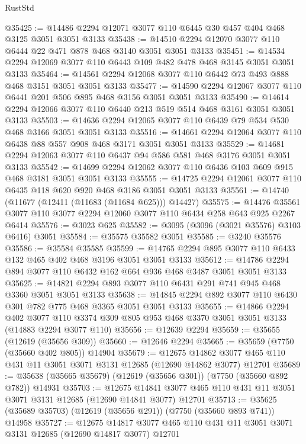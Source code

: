 \begin{lexlean}{RustStd}
\begin{coremodule}
@35425 := @14486 @2294 @12071 @3077 @110 @6445 @30 @457 @404 @468 @3125 @3051 @3051 @3133
@35438 := @14510 @2294 @12070 @3077 @110 @6444 @22 @471 @878 @468 @3140 @3051 @3051 @3133
@35451 := @14534 @2294 @12069 @3077 @110 @6443 @109 @482 @478 @468 @3145 @3051 @3051 @3133
@35464 := @14561 @2294 @12068 @3077 @110 @6442 @73 @493 @888 @468 @3151 @3051 @3051 @3133
@35477 := @14590 @2294 @12067 @3077 @110 @6441 @201 @506 @895 @468 @3156 @3051 @3051 @3133
@35490 := @14614 @2294 @12066 @3077 @110 @6440 @213 @519 @514 @468 @3161 @3051 @3051 @3133
@35503 := @14636 @2294 @12065 @3077 @110 @6439 @79 @534 @530 @468 @3166 @3051 @3051 @3133
@35516 := @14661 @2294 @12064 @3077 @110 @6438 @88 @557 @908 @468 @3171 @3051 @3051 @3133
@35529 := @14681 @2294 @12063 @3077 @110 @6437 @94 @586 @581 @468 @3176 @3051 @3051 @3133
@35542 := @14699 @2294 @12062 @3077 @110 @6436 @103 @609 @915 @468 @3181 @3051 @3051 @3133
@35555 := @14725 @2294 @12061 @3077 @110 @6435 @118 @620 @920 @468 @3186 @3051 @3051 @3133
@35561 := @14740 (@11677 (@12411 (@11683 (@11684 @625))) @14427)
@35575 := @14476 @35561 @3077 @110 @3077 @2294 @12060 @3077 @110 @6434 @258 @643 @925 @2267 @6414
@35576 := @3023 @625
@35582 := @3095 (@3096 (@3021 @35576) @3103 @6416) @3051
@35584 := @35575 @35582 @3051
@35585 := @3240 @35576
@35586 := @35584 @35585
@35599 := @14765 @2294 @895 @3077 @110 @6433 @132 @465 @402 @468 @3196 @3051 @3051 @3133
@35612 := @14786 @2294 @894 @3077 @110 @6432 @162 @664 @936 @468 @3487 @3051 @3051 @3133
@35625 := @14821 @2294 @893 @3077 @110 @6431 @291 @741 @945 @468 @3360 @3051 @3051 @3133
@35638 := @14845 @2294 @892 @3077 @110 @6430 @301 @782 @775 @468 @3365 @3051 @3051 @3133
@35655 := @14866
    @2294
    @402
    @3077
    @110
    @3374
    @309
    @805
    @953
    @468
    @3370
    @3051
    @3051
    @3133
    (@14883 @2294 @3077 @110)
@35656 := @12639 @2294
@35659 := @35655 (@12619 (@35656 @309))
@35660 := @12646 @2294
@35665 := @35659 (@7750 (@35660 @402 @805)) @14904
@35679 := @12675
    @14862
    @3077
    @465
    @110
    @431
    @11
    @3051
    @3071
    @3131
    @12685
    (@12690 @14862 @3077)
    @12701
@35689 := @35638 (@35665 @35679) (@12619 (@35656 @301)) (@7750 (@35660 @892 @782)) @14931
@35703 := @12675
    @14841
    @3077
    @465
    @110
    @431
    @11
    @3051
    @3071
    @3131
    @12685
    (@12690 @14841 @3077)
    @12701
@35713 := @35625 (@35689 @35703) (@12619 (@35656 @291)) (@7750 (@35660 @893 @741)) @14958
@35727 := @12675
    @14817
    @3077
    @465
    @110
    @431
    @11
    @3051
    @3071
    @3131
    @12685
    (@12690 @14817 @3077)
    @12701

\end{coremodule}
\end{lexlean}
